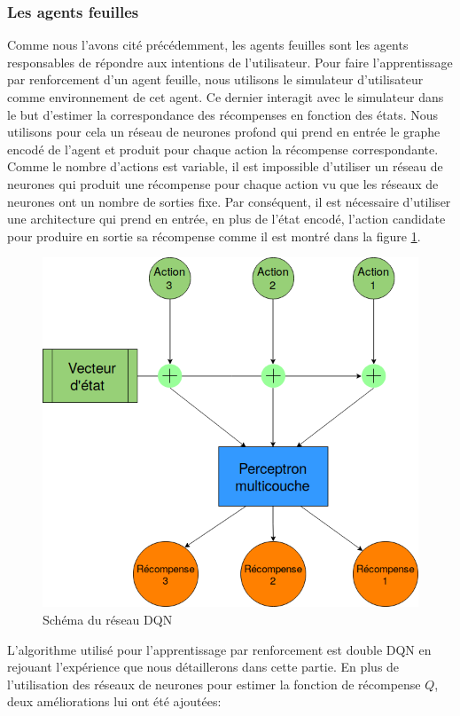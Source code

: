 \subsubsection*{Les agents feuilles}
Comme nous l'avons cité précédemment, les agents feuilles sont les agents responsables de répondre aux intentions de l'utilisateur. Pour faire l'apprentissage par renforcement d'un agent feuille, nous utilisons le simulateur d'utilisateur comme environnement de cet agent. Ce dernier interagit avec le simulateur dans le but d'estimer la correspondance des récompenses en fonction des états. Nous utilisons pour cela un réseau de neurones profond qui prend en entrée le graphe encodé de l'agent et produit pour chaque action la récompense correspondante. Comme le nombre d'actions est variable, il est impossible d'utiliser un réseau de neurones qui produit une récompense pour chaque action vu que les réseaux de neurones ont un nombre de sorties fixe. Par conséquent, il est nécessaire d'utiliser une architecture qui prend en entrée, en plus de l'état encodé, l'action candidate pour produire en sortie sa récompense comme il est montré dans la figure \ref{time_dist}.
\begin{figure}
	\centering
	\includegraphics[width=0.5\linewidth]{images/Conception/DM/time_dist.png}
	\caption{Schéma du réseau DQN}\label{time_dist}
\end{figure}
\par L'algorithme utilisé pour l'apprentissage par renforcement est double DQN en rejouant l'expérience que nous détaillerons dans cette partie. En plus de l'utilisation des réseaux de neurones pour estimer la fonction de récompense $Q$, deux améliorations lui ont été ajoutées:
